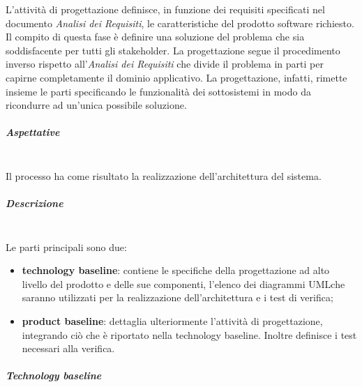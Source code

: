 L'attività di progettazione definisce, in funzione dei requisiti specificati 
nel documento \textit{Analisi dei Requisiti}, le caratteristiche del prodotto 
software richiesto. Il compito di questa fase è definire una soluzione del 
problema che sia soddisfacente per tutti gli stakeholder. La progettazione segue 
il procedimento inverso rispetto all'\textit{Analisi dei Requisiti} che divide 
il problema in parti per capirne completamente il dominio applicativo. La 
progettazione, infatti, rimette insieme le parti specificando le funzionalità 
dei sottosistemi in modo da ricondurre ad un'unica possibile soluzione. \newline 


\subparagraph{Aspettative} \mbox{}\\

Il processo ha come risultato la realizzazione dell'architettura del sistema. 
\newline

\subparagraph{Descrizione}  \mbox{}\\

Le parti principali sono due:
	\begin{itemize}
		\item \textbf{technology baseline}: contiene le specifiche della 
			progettazione ad alto livello del prodotto e delle sue componenti, l'elenco dei 
			diagrammi UML\glosp che saranno utilizzati per la realizzazione 
			dell'architettura e i test di verifica;
		\item \textbf{product baseline}: dettaglia ulteriormente l'attività di 
			progettazione, integrando ciò che è riportato nella technology baseline. Inoltre 
			definisce i test necessari alla verifica. \newline
	\end{itemize}


\subparagraph{Technology baseline} \mbox{}\\

